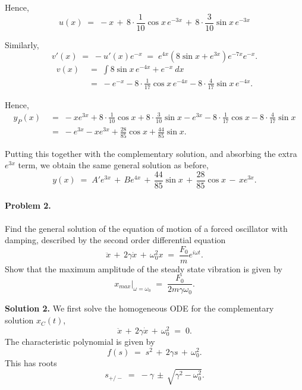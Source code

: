 \documentclass[10pt]{article}
\begin{document}
        Hence, 
        \[
        u(x) \;=\; -x \,+\, 8\cdot\frac{1}{10}\cos{x}\,e^{-3x} \,+\, 8\cdot\frac{3}{10}\sin{x}\,e^{-3x}
        \]

        Similarly,
        \[
        v'(x) \;=\; -u'(x)e^{-x} \;=\; e^{4x} (8\sin{x} + e^{3x}) e^{-7x} e^{-x}.
        \]
        \begin{align*}
        v(x) \;&=\; \int 8\sin{x}\,e^{-4x} + e^{-x} \:dx\\
        \;&=\; -e^{-x} -8\cdot\frac{1}{17}\cos{x}\,e^{-4x} -8\cdot\frac{4}{17}\sin{x}\,e^{-4x}.
        \end{align*}

        Hence,
        \begin{align*}
        y_P(x) \;&=\; -xe^{3x} + 8\cdot\frac{1}{10}\cos{x} + 8\cdot\frac{3}{10}\sin{x} - e^{3x} - 8\cdot\frac{1}{17}\cos{x} - 8\cdot\frac{4}{17}\sin{x} \\
        \;&=\; -e^{3x} - xe^{3x} + \frac{28}{85}\cos{x} + \frac{44}{85}\sin{x}.
        \end{align*}

        Putting this together with the complementary solution, and absorbing the extra $e^{3x}$ term, we obtain the same general solution as before,
        \[
        y(x) \;=\; A'e^{3x} \,+\, Be^{4x} \,+\, \frac{44}{85}\sin{x} \,+\, \frac{28}{85}\cos{x} \,-\, xe^{3x}. \tag{\star}
        \]
        \clearpage

        \paragraph{Problem 2.} Find the general solution of the equation of motion of a forced oscillator with damping, described by the
        second order differential equation 
        \[
        \ddot{x} \,+\, 2\gamma\dot{x} \,+\, \omega_0^2x \;=\; \frac{F_0}{m}e^{i\omega t}.
        \]
        Show that the maximum amplitude of the steady state vibration is given by
        \[
        x_{max}\Big|_{\omega = \omega_0} \;=\; \frac{F_0}{2m\gamma\omega_0}.
        \]

        \textbf{Solution 2.}
        We first solve the homogeneous ODE for the complementary solution $x_C(t)$,
        \[
        \ddot{x} \,+\, 2\gamma\dot{x} \,+\, \omega_0^2 \;=\; 0.
        \]
        The characteristic polynomial is given by
        \[
        f(s) \;=\; s^2 \,+\, 2\gamma s \,+\, \omega_0^2.
        \]
        This has roots
        \[
        s_{+/-} \;=\; -\gamma \,\pm\,\sqrt{\gamma^2 - \omega_0^2}.
        \]
\end{document}
